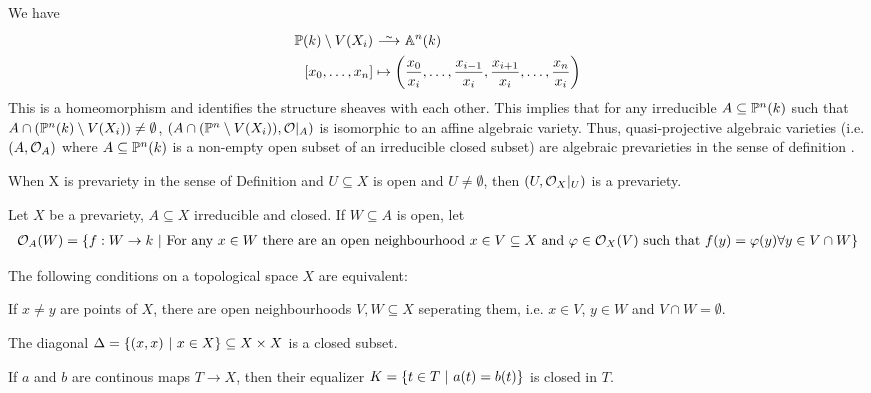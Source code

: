 \documentclass[a4paper,parskip=full,numbers=enddot]{scrreprt}
\begin{document}
\begin{defi}
\begin{example}
     We have 
     \begin{align*}
        \IP(k)\setminus V(X_i) &\isomorphism \IA^n(k)\\
        [x_0,\ldots, x_n]&\mapsto \left(\frac{x_0}{x_i}, \ldots, 
        \frac{x_{i-1}}{x_i},\frac{x_{i+1}}{x_i},\ldots,\frac{x_n}{x_i}\right)
    \end{align*}
    This is a homeomorphism and identifies the structure sheaves with each other. This implies that for any irreducible $A\subseteq \mathbb{P}^n(k)$ such that $A\cap(\mathbb{P}^n(k)\setminus V(X_i)) \neq \emptyset$, $(A\cap(\mathbb{P}^n\setminus V(X_i)), \mathcal{O}|_A) $ is isomorphic to an affine algebraic variety. Thus, quasi-projective algebraic varieties (i.e. $(A,\mathcal{O}_A)$ where $A\subseteq \mathbb{P}^n(k)$ is a non-empty open subset of an irreducible closed subset) are algebraic prevarieties in the sense of definition .
\end{example}
\begin{example}[3a]
 When X is prevariety in the sense of Definition  and $U\subseteq X$ is open and $U\neq \emptyset$, then $(U,\mathcal{O}_X|_U)$ is a prevariety.
\end{example}
\begin{example}[3b]
 Let $X$ be a prevariety, $A\subseteq X$ irreducible and closed. If $W\subseteq A$ is open, let
 \begin{align*}
    \mathcal{O}_A(W) = \left\{ f: W\to k \ \middle|\  \text{For any } x\in W\text{ there are an open neighbourhood } x\in V\subseteq X \text{ and } \varphi\in \mathcal{O}_X(V) \text{ such that } f(y) = \varphi(y) \forall y\in V\cap W\right\}
 \end{align*}

\end{example}

\begin{rem*}
 The following conditions on a topological space $X$ are equivalent:
 \begin{alphanumerate}
  \item
    If $x\neq y$ are points of $X$, there are open neighbourhoods $V,W\subseteq X$ seperating them, i.e. $x\in V$, $y\in W$ and $V\cap W= \emptyset$.
  \item
    The diagonal $\Delta = \left\{(x,x)\ \middle|\  x\in X\right\}\subseteq X\times X$ is a closed subset.
  \item 
    If $a$ and $b$ are continous maps $T\to X$, then their equalizer $K = \left\{t\in T\ \middle|\  a(t) = b(t)\right\}$ is closed in $T$.
 \end{alphanumerate}


\end{rem*}
\end{defi}
\end{document}
